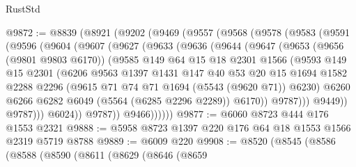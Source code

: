 \begin{lexlean}{RustStd}
\begin{coremodule}
@9872 := @8839
    (@8921
      (@9202
        (@9469
          (@9557
            (@9568
              (@9578
                (@9583
                  (@9591
                    (@9596
                      (@9604
                        (@9607
                          (@9627
                            (@9633
                              (@9636
                                (@9644
                                  (@9647
                                    (@9653
                                      (@9656 (@9801 @9803 @6170))
                                      (@9585
                                        @149
                                        @64
                                        @15
                                        @18
                                        @2301
                                        @1566
                                        (@9593
                                          @149
                                          @15
                                          @2301
                                          (@6206
                                            @9563
                                            @1397
                                            @1431
                                            @147
                                            @40
                                            @53
                                            @20
                                            @15
                                            @1694
                                            @1582
                                            @2288
                                            @2296
                                            (@9615 @71 @74 @71 @1694 (@5543 (@9620 @71)) @6230)
                                            @6260
                                            @6266
                                            @6282
                                            @6049
                                            (@5564 (@6285 @2296 @2289))
                                            @6170))
                                        @9787)))
                                  @9449))
                              @9787)))
                        @6024))
                    @9787))
                @9466))))))
@9877 := @6060 @8723 @444 @176 @1553 @2321
@9888 := @5958 @8723 @1397 @220 @176 @64 @18 @1553 @1566 @2319 @5719 @8788
@9889 := @6009 @220
@9908 := @8520
    (@8545
      (@8586
        (@8588
          (@8590
            (@8611
              (@8629
                (@8646
                  (@8659

\end{coremodule}
\end{lexlean}
